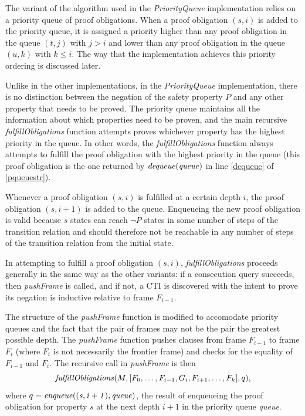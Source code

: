 \documentclass[12pt,a4paper,twoside,openright]{report}
\begin{document}
{The variant of the algorithm used in the {\it PriorityQueue} implementation
relies on a priority queue of proof obligations.
When a proof obligation $(s,i)$ is added to the priority queue,
it is assigned a priority higher than any proof obligation in the queue $(t,j)$ with $j > i$
and lower than any proof obligation in the queue $(u,k)$ with $k \leq i$. The
way that the implementation achieves this priority ordering is discussed later.

Unlike in the other implementations, in the {\it PriorityQueue} implementation, there is
no distinction between the negation of the safety property $P$ and any other property that needs
to be proved. The priority queue maintains all the information about which properties need to be proven,
and the main recursive {\it fulfillObligations} function attempts proves whichever property has the highest
priority in the queue. In other words, the {\it fulfillObligations} function always 
attempts to fulfill the proof obligation with the highest priority in the queue (this proof obligation
is the one returned by ${\it dequeue(queue)}$ in line \ref{dequeue} of \ref{pqueuestr}).

Whenever a proof obligation $(s,i)$ is fulfilled at a certain depth $i$, the proof obligation
$(s, i + 1)$ is added to the queue. Enqueueing the new proof obligation is valid
because $s$ states can reach $\neg P$ states in some
number of steps of the transition relation and should therefore
not be reachable in any number of steps of the transition relation from the initial state.

In attempting to fulfill a proof obligation $(s,i)$, {\it fulfillObligations} proceeds
generally in the same way as the other variants: if a consecution query succeeds,
then {\it pushFrame} is called, and if not, a CTI is discovered with the intent to
prove its negation is inductive relative to frame $F_{i - 1}$.

The structure of the {\it pushFrame} function is modified to accomodate priority queues
and the fact that the pair of frames may not be the pair the greatest possible depth.
The {\it pushFrame} function pushes clauses from frame $F_{i - 1}$ to frame $F_i$ (where
$F_i$ is not necessarily the frontier frame) and checks
for the equality of $F_{i - 1}$ and $F_i$.
The recursive call in {\it pushFrame} is then
$${\it fulfillObligations}(M,[F_0,\ldots,F_{i - 1},G_i,F_{i + 1}, \ldots, F_k], q),$$
where $q = {\it enqueue((s, i+1), queue)}$, the result of enqueueing the proof obligation
for property $s$ at the next depth $i + 1$ in the priority queue {\it queue}.

}
\end{document}
